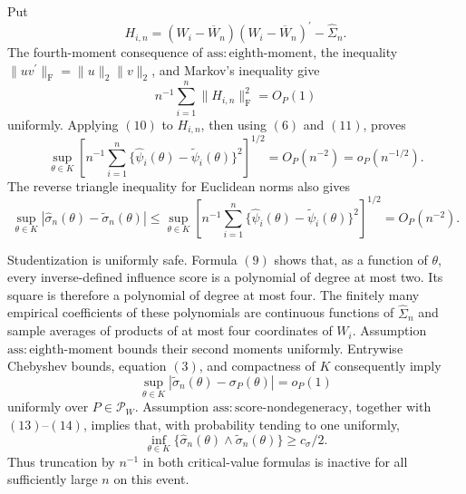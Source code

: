 Put
\[
 H_{i,n}=(W_i-\overline W_n)(W_i-\overline W_n)^{\prime}-\widehat\Sigma_n.
\]
The fourth-moment consequence of \(\mathrm{ass:eighth\mbox{-}moment}\), the inequality \(\|uv^{\prime}\|_{\mathrm F}=\|u\|_2\|v\|_2\), and Markov's inequality give
\[
 n^{-1}\sum_{i=1}^n\|H_{i,n}\|_{\mathrm F}^2=O_P(1) \tag{11}
\]
uniformly. Applying \((10)\) to \(H_{i,n}\), then using \((6)\) and \((11)\), proves
\[
 \sup_{\theta\in K}
 \left[n^{-1}\sum_{i=1}^n
   \{\widehat\psi_i(\theta)-\widetilde\psi_i(\theta)\}^2
 \right]^{1/2}
 =O_P(n^{-2})=o_P(n^{-1/2}). \tag{12}
\]
The reverse triangle inequality for Euclidean norms also gives
\[
 \sup_{\theta\in K}|\widehat\sigma_n(\theta)-\widetilde\sigma_n(\theta)|
 \leq
 \sup_{\theta\in K}
 \left[n^{-1}\sum_{i=1}^n
   \{\widehat\psi_i(\theta)-\widetilde\psi_i(\theta)\}^2
 \right]^{1/2}
 =O_P(n^{-2}). \tag{13}
\]

Studentization is uniformly safe. Formula \((9)\) shows that, as a function of \(\theta\), every inverse-defined influence score is a polynomial of degree at most two. Its square is therefore a polynomial of degree at most four. The finitely many empirical coefficients of these polynomials are continuous functions of \(\widehat\Sigma_n\) and sample averages of products of at most four coordinates of \(W_i\). Assumption \(\mathrm{ass:eighth\mbox{-}moment}\) bounds their second moments uniformly. Entrywise Chebyshev bounds, equation \((3)\), and compactness of \(K\) consequently imply
\[
 \sup_{\theta\in K}|\widetilde\sigma_n(\theta)-\sigma_P(\theta)|=o_P(1) \tag{14}
\]
uniformly over \(P\in\mathcal P_W\). Assumption \(\mathrm{ass:score\mbox{-}nondegeneracy}\), together with \((13)\)--\((14)\), implies that, with probability tending to one uniformly,
\[
 \inf_{\theta\in K}\{\widehat\sigma_n(\theta)\wedge\widetilde\sigma_n(\theta)\}
 \geq c_{\sigma}/2. \tag{15}
\]
Thus truncation by \(n^{-1}\) in both critical-value formulas is inactive for all sufficiently large \(n\) on this event.

